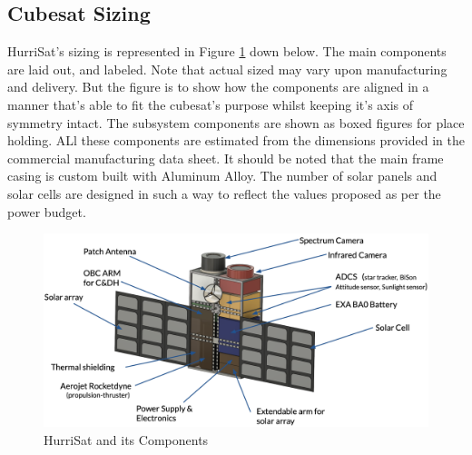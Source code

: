 \newpage
\subsection{Cubesat Sizing}
HurriSat's sizing is represented in Figure \ref{fig:hurrisat} down below. The main components are laid out, and labeled. Note that actual sized may vary upon manufacturing and delivery. But the figure is to show how the components are aligned in a manner that's able to fit the cubesat's purpose whilst keeping it's axis of symmetry intact. The subsystem components are shown as boxed figures for place holding. ALl these components are estimated from the dimensions provided in the commercial manufacturing data sheet. It should be  noted that the main frame casing is custom built with Aluminum Alloy. The number of solar panels and solar cells are designed in such a way to reflect the values proposed as per the power budget. \\[.2in]

\begin{figure}[hbt!]
    \centering
    \includegraphics[width=\textwidth,frame, keepaspectratio]{Images/hurrisat.png}
    \caption{HurriSat and its Components}
    \label{fig:hurrisat}
\end{figure}
\vspace{0.5cm}
